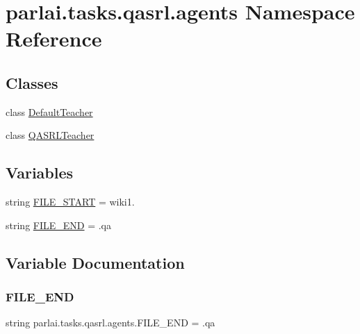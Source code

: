 \hypertarget{namespaceparlai_1_1tasks_1_1qasrl_1_1agents}{}\section{parlai.\+tasks.\+qasrl.\+agents Namespace Reference}
\label{namespaceparlai_1_1tasks_1_1qasrl_1_1agents}
\subsection*{Classes}
\begin{DoxyCompactItemize}
\item 
class \hyperlink{classparlai_1_1tasks_1_1qasrl_1_1agents_1_1DefaultTeacher}{Default\+Teacher}
\item 
class \hyperlink{classparlai_1_1tasks_1_1qasrl_1_1agents_1_1QASRLTeacher}{Q\+A\+S\+R\+L\+Teacher}
\end{DoxyCompactItemize}
\subsection*{Variables}
\begin{DoxyCompactItemize}
\item 
string \hyperlink{namespaceparlai_1_1tasks_1_1qasrl_1_1agents_ad2a9205e314e6183e0f6937197128744}{F\+I\+L\+E\+\_\+\+S\+T\+A\+RT} = \textquotesingle{}wiki1.\textquotesingle{}
\item 
string \hyperlink{namespaceparlai_1_1tasks_1_1qasrl_1_1agents_a4831d419f369db35cf35d1ea7fa0713f}{F\+I\+L\+E\+\_\+\+E\+ND} = \textquotesingle{}.qa\textquotesingle{}
\end{DoxyCompactItemize}


\subsection{Variable Documentation}
\mbox{\label{namespaceparlai_1_1tasks_1_1qasrl_1_1agents_a4831d419f369db35cf35d1ea7fa0713f}} 
\subsubsection{\texorpdfstring{F\+I\+L\+E\+\_\+\+E\+ND}{FILE\_END}}
{\footnotesize\ttfamily string parlai.\+tasks.\+qasrl.\+agents.\+F\+I\+L\+E\+\_\+\+E\+ND = \textquotesingle{}.qa\textquotesingle{}}

